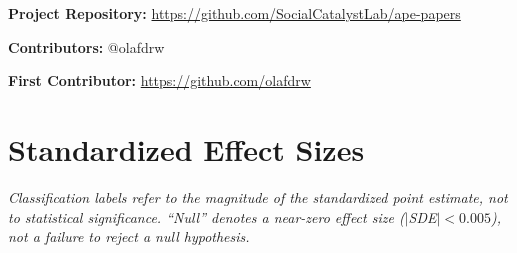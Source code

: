 \documentclass[12pt]{article}
\begin{document}
\noindent\textbf{Project Repository:} \url{https://github.com/SocialCatalystLab/ape-papers}

\noindent\textbf{Contributors:} @olafdrw

\noindent\textbf{First Contributor:} \url{https://github.com/olafdrw}

\label{apep_main_text_end}
\newpage


\newpage
\appendix

\section{Standardized Effect Sizes}
\label{sec:sde}



\vspace{1em}
\noindent\textit{Classification labels refer to the magnitude of the standardized point estimate, not to statistical significance. ``Null'' denotes a near-zero effect size ($|$SDE$| < 0.005$), not a failure to reject a null hypothesis.}
\end{document}
